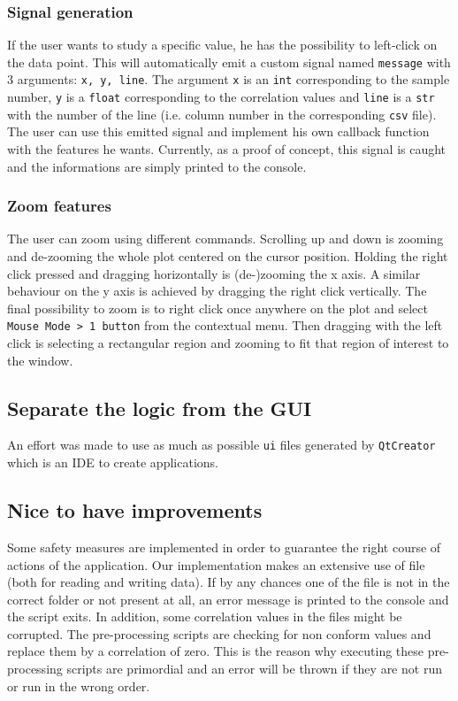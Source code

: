\documentclass[11pt,a4paper]{article}
\begin{document}
\subsubsection{Signal generation}
If the user wants to study a specific value, he has the possibility to left-click on the data point. This will automatically emit a custom signal named \texttt{message} with 3 arguments: \texttt{x, y, line}. The argument \texttt{x} is an \texttt{int} corresponding to the sample number, \texttt{y} is a \texttt{float} corresponding to the correlation values and \texttt{line} is a \texttt{str} with the number of the line (i.e. column number in the corresponding \texttt{csv} file). The user can use this emitted signal and implement his own callback function with the features he wants. Currently, as a proof of concept, this signal is caught and the informations are simply printed to the console.

\subsubsection{Zoom features}
The user can zoom using different commands. Scrolling up and down is zooming and de-zooming the whole plot centered on the cursor position. Holding the right click pressed and dragging horizontally is (de-)zooming the x axis. A similar behaviour on the y axis is achieved by dragging the right click vertically. The final possibility to zoom is to right click once anywhere on the plot and select \texttt{Mouse Mode > 1 button} from the contextual menu. Then dragging with the left click is selecting a rectangular region and zooming to fit that region of interest to the window.

\subsection{Separate the logic from the GUI}
An effort was made to use as much as possible \texttt{ui} files generated by \texttt{QtCreator} which is an IDE to create applications. 

\subsection{Nice to have improvements}
Some safety measures are implemented in order to guarantee the right course of actions of the application. Our implementation makes an extensive use of file (both for reading and writing data). If by any chances one of the file is not in the correct folder or not present at all, an error message is printed to the console and the script exits. In addition, some correlation values in the files might be corrupted. The pre-processing scripts are checking for non conform values and replace them by a correlation of zero. This is the reason why executing these pre-processing scripts are primordial and an error will be thrown if they are not run or run in the wrong order. 
\end{document}
